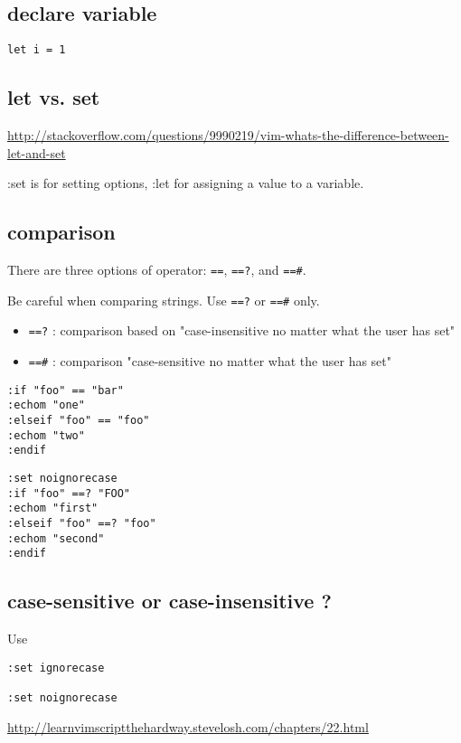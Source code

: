 \subsection{declare variable}

\begin{verbatim}
let i = 1
\end{verbatim}


\subsection{let vs. set}

\url{http://stackoverflow.com/questions/9990219/vim-whats-the-difference-between-let-and-set}

:set is for setting options, :let for assigning a value to a variable.



\subsection{comparison}

There are three options of operator: \verb!==!, \verb!==?!, and \verb!==#!.

Be careful when comparing strings. Use \verb!==?! or \verb!==#! only.
\begin{itemize}
  \item \verb!==?! : comparison based on "case-insensitive no matter what the
  user has set" 
  
  \item \verb!==#! : comparison "case-sensitive no matter what the user has
  set" 
\end{itemize}

\begin{verbatim}
:if "foo" == "bar"
:echom "one"
:elseif "foo" == "foo"
:echom "two"
:endif
\end{verbatim}

\begin{verbatim}
:set noignorecase
:if "foo" ==? "FOO"
:echom "first"
:elseif "foo" ==? "foo"
:echom "second"
:endif
\end{verbatim}

\subsection{case-sensitive or case-insensitive ?}

Use
\begin{verbatim}
:set ignorecase

:set noignorecase
\end{verbatim}
\url{http://learnvimscriptthehardway.stevelosh.com/chapters/22.html}

